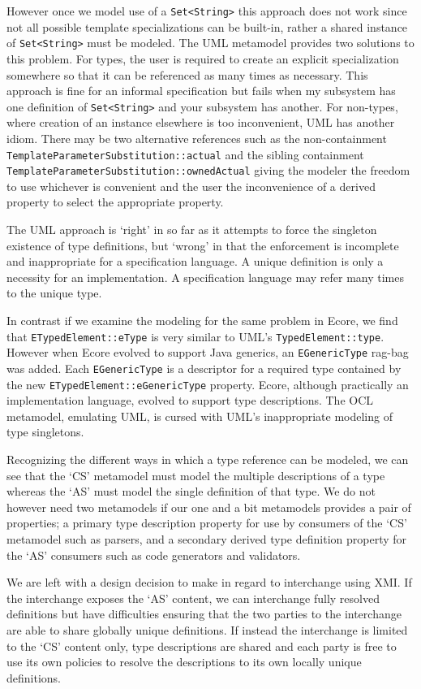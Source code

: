 \documentclass{jot}
\begin{document}
However once we model use of a \verb$Set<String>$ this approach does not work since not all possible template specializations can be built-in, rather a shared instance of \verb$Set<String>$ must be modeled. The UML metamodel provides two solutions to this problem. For types, the user is required to create an explicit specialization somewhere so that it can be referenced as many times as necessary. This approach is fine for an informal specification but fails when my subsystem has one definition of \verb$Set<String>$ and your subsystem has another. For non-types, where creation of an instance elsewhere is too inconvenient, UML has another idiom. There may be two alternative references such as the non-containment \verb$TemplateParameterSubstitution::actual$ and the sibling containment \verb$TemplateParameterSubstitution::ownedActual$ giving the modeler the freedom to use whichever is convenient and the user the inconvenience of a derived property to select the appropriate property.

The UML approach is `right' in so far as it attempts to force the singleton existence of type definitions, but `wrong' in that the enforcement is incomplete and inappropriate for a specification language. A unique definition is only a necessity for an implementation. A specification language may refer many times to the unique type.

In contrast if we examine the modeling for the same problem in Ecore, we find that \verb$ETypedElement::eType$ is very similar to UML's \verb$TypedElement::type$. However when Ecore evolved to support Java generics, an \verb$EGenericType$ rag-bag was added. Each \verb$EGenericType$ is a descriptor for a required type contained by the new \verb$ETypedElement::eGenericType$ property. Ecore, although practically an implementation language, evolved to support type descriptions. The OCL metamodel, emulating UML, is cursed with UML's inappropriate modeling of type singletons. 

Recognizing the different ways in which a type reference can be modeled, we can see that the `CS' metamodel must model the multiple descriptions of a type whereas the `AS' must model the single definition of that type. We do not however need two metamodels if our one and a bit metamodels provides a pair of properties; a primary type description property for use by consumers of the `CS' metamodel such as parsers, and a secondary derived type definition property for the `AS' consumers such as code generators and validators.

We are left with a design decision to make in regard to interchange using XMI. If the interchange exposes the `AS' content, we can interchange fully resolved definitions but have difficulties ensuring that the two parties to the interchange are able to share globally unique definitions. If instead the interchange is limited to the `CS' content only, type descriptions are shared and each party is free to use its own policies to resolve the descriptions to its own locally unique definitions. %
\end{document}

